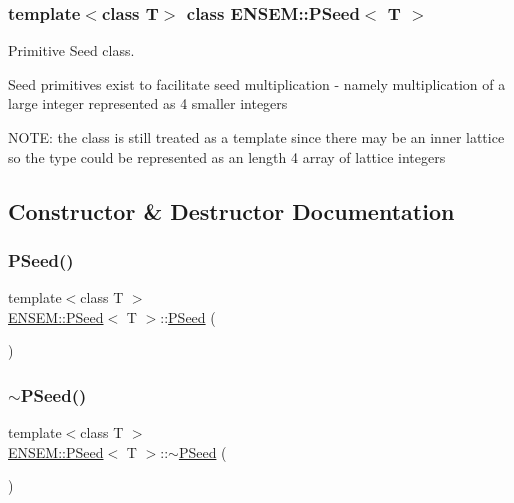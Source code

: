 \subsubsection*{template$<$class T$>$\newline
class E\+N\+S\+E\+M\+::\+P\+Seed$<$ T $>$}

Primitive Seed class. 

Seed primitives exist to facilitate seed multiplication -\/ namely multiplication of a large integer represented as 4 smaller integers

N\+O\+TE\+: the class is still treated as a template since there may be an inner lattice so the type could be represented as an length 4 array of lattice integers 

\subsection{Constructor \& Destructor Documentation}
\mbox{\label{classENSEM_1_1PSeed_a23818769d84caba2047eaf425f2073f1}} 
\subsubsection{\texorpdfstring{PSeed()}{PSeed()}\hspace{0.1cm}{\footnotesize\ttfamily [1/9]}}
{\footnotesize\ttfamily template$<$class T $>$ \\
\mbox{\hyperlink{classENSEM_1_1PSeed}{E\+N\+S\+E\+M\+::\+P\+Seed}}$<$ T $>$\+::\mbox{\hyperlink{classENSEM_1_1PSeed}{P\+Seed}} (\begin{DoxyParamCaption}{ }\end{DoxyParamCaption})\hspace{0.3cm}{\ttfamily [inline]}}

\mbox{\label{classENSEM_1_1PSeed_a6796252e24ea4c2ec43bf2600f2ffdc7}} 
\subsubsection{\texorpdfstring{$\sim$PSeed()}{~PSeed()}\hspace{0.1cm}{\footnotesize\ttfamily [1/3]}}
{\footnotesize\ttfamily template$<$class T $>$ \\
\mbox{\hyperlink{classENSEM_1_1PSeed}{E\+N\+S\+E\+M\+::\+P\+Seed}}$<$ T $>$\+::$\sim$\mbox{\hyperlink{classENSEM_1_1PSeed}{P\+Seed}} (\begin{DoxyParamCaption}{ }\end{DoxyParamCaption})\hspace{0.3cm}{\ttfamily [inline]}}

